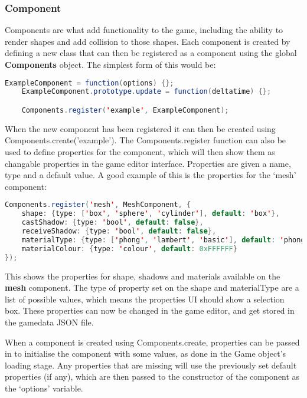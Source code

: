 	\subsubsection{Component}
	Components are what add functionality to the game, including the ability to render shapes and add collision to those shapes. Each component is created by defining a new class that can then be registered as a component using the global \textbf{Components} object. The simplest form of this would be:

	\begin{lstlisting}[language=Java]
	ExampleComponent = function(options) {};
	ExampleComponent.prototype.update = function(deltatime) {};

	Components.register('example', ExampleComponent);\end{lstlisting}

	When the new component has been registered it can then be created using Components.create('example'). The Components.register function can also be used to define properties for the component, which will then show them as changable properties in the game editor interface. Properties are given a name, type and a default value. A good example of this is the properties for the `mesh' component:

	\begin{lstlisting}[language=Java]
Components.register('mesh', MeshComponent, {
	shape: {type: ['box', 'sphere', 'cylinder'], default: 'box'},
	castShadow: {type: 'bool', default: false},
	receiveShadow: {type: 'bool', default: false},
	materialType: {type: ['phong', 'lambert', 'basic'], default: 'phong'},
	materialColour: {type: 'colour', default: 0xFFFFFF}
});\end{lstlisting}

	This shows the properties for shape, shadows and materials available on the \textbf{mesh} component. The type of property set on the shape and materialType are a list of possible values, which means the properties UI should show a selection box. These properties can now be changed in the game editor, and get stored in the gamedata JSON file.

	When a component is created using Components.create, properties can be passed in to initialise the component with some values, as done in the Game object's loading stage. Any properties that are missing will use the previously set default properties (if any), which are then passed to the constructor of the component as the `options' variable.

